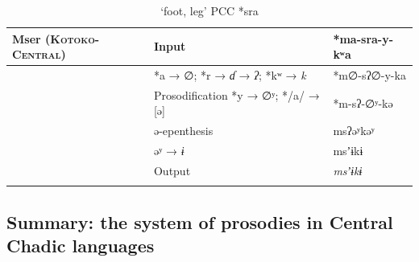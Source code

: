\documentclass[output=paper]{langscibook}
\begin{document}
\begin{table}
\caption{‘foot, leg’ PCC *sra}
\small
\label{extab:wolff:17}


\begin{tabular}{lll}
\lsptoprule
Mser (\textsc{Kotoko-Central}) & Input                                  & *ma-sra-y-kʷa\\
                                \midrule
                               & *a → ∅; *r → \textit{ɗ} → \textit{ʔ}; *kʷ → \textit{k}           & *m∅-sʔ∅-y-ka\\
                               & Prosodification *y → ∅ʸ;   */a/ → [ə] & *m-sʔ-∅ʸ-kə\\
                               & ə-epenthesis
                               & msʔəʸkəʸ\\
                               & əʸ → \textit{ɨ}
                               & msʼɨkɨ\\
                               \midrule
                               & Output
                               & \textit{msʼɨkɨ} \\
\lspbottomrule
\end{tabular}

\end{table}

\subsection{Summary: the system of prosodies in Central Chadic languages}
\label{sec:Wolff:2.4}
\end{document}
